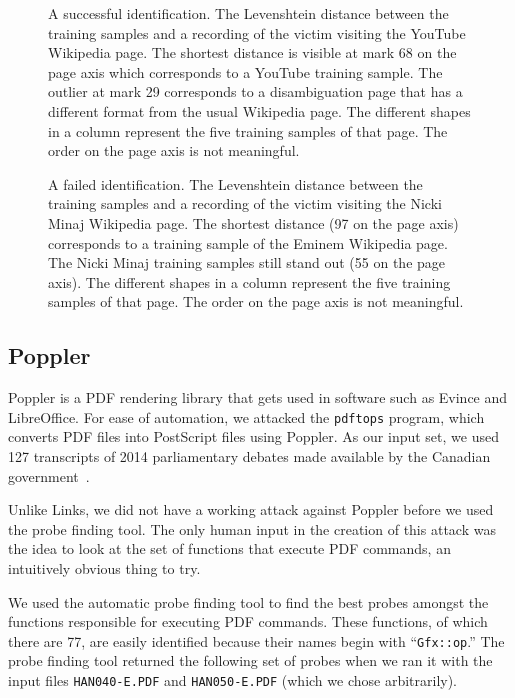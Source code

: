 \documentclass[letterpaper,twocolumn,10pt]{article}
\begin{document}
\begin{figure*}
    \centering
    
    \caption{A successful identification. The Levenshtein distance between the
    training samples and a recording of the victim visiting the YouTube
    Wikipedia page. The shortest distance is visible at mark 68 on the page axis
    which corresponds to a YouTube training sample. The outlier at mark 29
    corresponds to a disambiguation page that has a different format from the
    usual Wikipedia page. The different shapes in a column represent the five
    training samples of that page. The order on the page axis is not
    meaningful.}
    \label{figure:youtube}
\end{figure*}

\begin{figure*}
    \centering
    
    \caption{A failed identification. The Levenshtein distance between the
    training samples and a recording of the victim visiting the Nicki Minaj
    Wikipedia page. The shortest distance (97 on the page axis) corresponds to
    a training sample of the Eminem Wikipedia page. The Nicki Minaj training
    samples still stand out (55 on the page axis). The different shapes in
    a column represent the five training samples of that page. The order on the
    page axis is not meaningful.}
    \label{figure:minaj}
\end{figure*}

\subsection{Poppler}

Poppler is a PDF rendering library that gets used in software such as Evince and
LibreOffice. For ease of automation, we attacked the \texttt{pdftops} program,
which converts PDF files into PostScript files using Poppler. As our input set,
we used 127 transcripts of 2014 parliamentary debates made available by the
Canadian government~\cite{hansard}.

Unlike Links, we did not have a working attack against Poppler before we used
the probe finding tool. The only human input in the creation of this attack was
the idea to look at the set of functions that execute PDF commands, an
intuitively obvious thing to try.

We used the automatic probe finding tool to find the best probes amongst the
functions responsible for executing PDF commands. These functions, of which
there are 77, are easily identified because their names begin with
``\texttt{Gfx::op}.'' The probe finding tool returned the following set of
probes when we ran it with the input files \texttt{HAN040-E.PDF} and
\texttt{HAN050-E.PDF} (which we chose arbitrarily).
\end{document}
